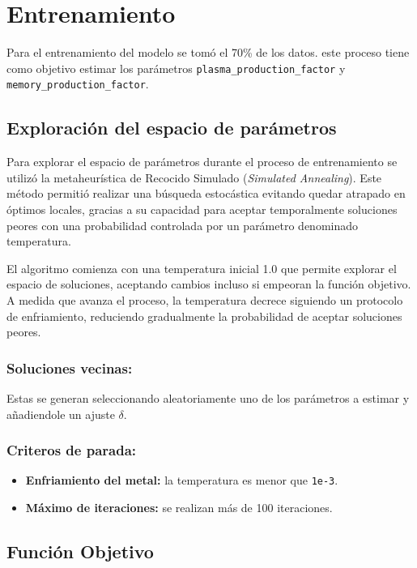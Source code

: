 \section{Entrenamiento}
Para el entrenamiento del modelo se tomó el 70\% de los datos. este proceso tiene como objetivo estimar los parámetros \texttt{plasma\_production\_factor} y \texttt{memory\_production\_factor}.

\subsection{Exploración del espacio de parámetros}

Para explorar el espacio de parámetros durante el proceso de entrenamiento se utilizó la metaheurística de Recocido Simulado (\textit{Simulated Annealing}). Este método permitió realizar una búsqueda estocástica evitando quedar atrapado en óptimos locales, gracias a su capacidad para aceptar temporalmente soluciones peores con una probabilidad controlada por un parámetro denominado temperatura.

El algoritmo comienza con una temperatura inicial 1.0 que permite explorar el espacio de soluciones, aceptando cambios incluso si empeoran la función objetivo. A medida que avanza el proceso, la temperatura decrece siguiendo un protocolo de enfriamiento, reduciendo gradualmente la probabilidad de aceptar soluciones peores.

\subsubsection{Soluciones vecinas:}
Estas se generan seleccionando aleatoriamente uno de los parámetros a estimar y añadiendole un ajuste $\delta$.

\subsubsection{Criteros de parada:}
\begin{itemize}
    \item \textbf{Enfriamiento del metal:} la temperatura es menor que \texttt{1e-3}.
    \item \textbf{Máximo de iteraciones:} se realizan más de 100 iteraciones.
\end{itemize}



\subsection{Función Objetivo}

